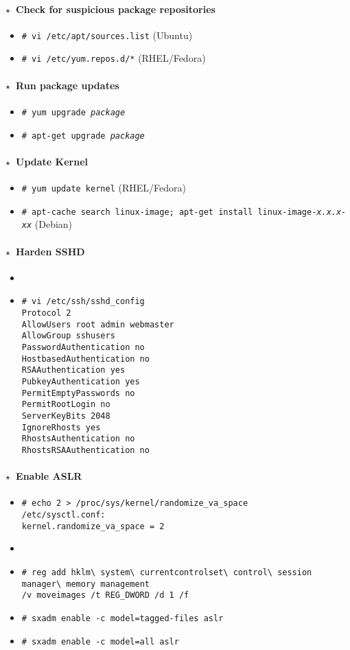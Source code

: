 \documentclass[10pt,landscape]{article}
\newcommand{\os}[1]{\texttt{\footnotesize{#1}}}
\newcommand{\unix}{\os{U}}
\newcommand{\linux}{\os{L}}
\newcommand{\solaris}{\os{S}}
\newcommand{\windows}{\os{W}}
\newenvironment{action}[1]
  {\paragraph{$\star$~#1}\begin{itemize}[leftmargin=1cm]}
  {\end{itemize}}
\newcommand{\cmd}[2]{\item[#1] {\small\tt\# #2}}
\newcommand{\comment}[1]{\textrm{\small(#1)}}
\newcommand{\tool}[2]{\item[#1] {\footnotesize\sc{#2}}\xspace}
\begin{document}
\begin{multicols*}{3}
\begin{action}{Check for suspicious package repositories}
\cmd{\linux}{vi /etc/apt/sources.list} \comment{Ubuntu}
\cmd{\linux}{vi /etc/yum.repos.d/*} \comment{RHEL/Fedora}
\end{action}

\begin{action}{Run package updates}
\cmd{\linux}{yum upgrade \emph{package}}
\cmd{\linux}{apt-get upgrade \emph{package}}
\end{action}

\begin{action}{Update Kernel}
\cmd{\linux}{yum update kernel} \comment{RHEL/Fedora}
\cmd{\linux}{apt-cache search linux-image; apt-get install
  linux-image-\emph{x.x.x-xx}} \comment{Debian}
\end{action}

\begin{action}{Harden SSHD}
\tool{\unix}{fail2ban}
\cmd{\unix}{vi /etc/ssh/sshd\_config\\
  Protocol 2\\
  AllowUsers root admin webmaster\\
  AllowGroup sshusers\\
  PasswordAuthentication no\\
  HostbasedAuthentication no\\
  RSAAuthentication yes\\
  PubkeyAuthentication yes\\
  PermitEmptyPasswords no\\
  PermitRootLogin no\\
  ServerKeyBits 2048\\
  IgnoreRhosts yes\\
  RhostsAuthentication no\\
  RhostsRSAAuthentication no}
\end{action}

\begin{action}{Enable ASLR}
\cmd{\linux}{echo 2 > /proc/sys/kernel/randomize\_va\_space\\
             /etc/sysctl.conf:\\kernel.randomize\_va\_space = 2}
\tool{\windows}{EMET}
\cmd{\windows}{reg add
               hklm{\textbackslash}%
               system{\textbackslash}%
               currentcontrolset{\textbackslash}%
               control{\textbackslash}
               session manager{\textbackslash}%
               memory management\\
               /v moveimages /t REG\_DWORD /d 1 /f}
\cmd{\solaris}{sxadm enable -c model=tagged-files aslr}
\cmd{\solaris}{sxadm enable -c model=all aslr}
\end{action}


\end{multicols*}
\end{document}
